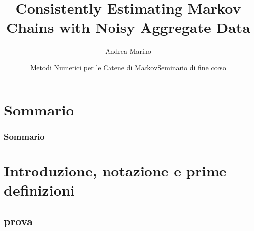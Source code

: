 \documentclass[10pt,xcolor={table,dvipsnames}]{beamer} 		%
\title[Seminario MNCM]{Consistently Estimating Markov Chains with Noisy Aggregate Data}			%
\author{Andrea Marino}
\institute[DI UniPi]{Università di Pisa}
\date[\today]{Metodi Numerici per le Catene di Markov\newline Seminario di fine corso}
\theoremstyle{plain}					%
\theoremstyle{definition}
\theoremstyle{remark}
\begin{document}
	\begin{frame}[plain]
		\titlepage
	\end{frame}
	
\section*{Sommario}
	\setcounter{tocdepth}{1}
	\begin{frame}
		\frametitle{Sommario}
		\tableofcontents
	\end{frame}
	
	\setcounter{tocdepth}{2}



\section{Introduzione, notazione e prime definizioni}
	\subsection*{prova}
\end{document}
